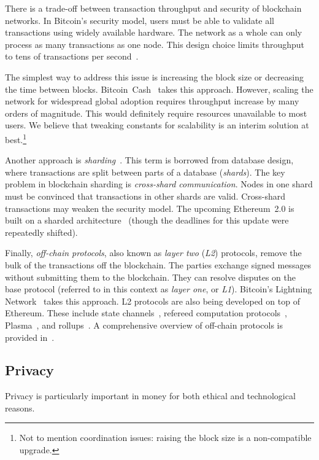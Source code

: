 There is a trade-off between transaction throughput and security of blockchain networks.
In Bitcoin's security model, users must be able to validate all transactions using widely available hardware.
The network as a whole can only process as many transactions as one node.
This design choice limits throughput to tens of transactions per second~\cite{Croman2016}.

The simplest way to address this issue is increasing the block size or decreasing the time between blocks.
Bitcoin~Cash~\cite{Kwon2019} takes this approach.
However, scaling the network for widespread global adoption requires throughput increase by many orders of magnitude.
This would definitely require resources unavailable to most users.
We believe that tweaking constants for scalability is an interim solution at best.\footnote{Not to mention coordination issues: raising the block size is a non-compatible upgrade.}

Another approach is \textit{sharding}~\cite{Gencer2016, Luu2016a}.
This term is borrowed from database design, where transactions are split between parts of a database (\textit{shards}).
The key problem in blockchain sharding is \textit{cross-shard communication}.
Nodes in one shard must be convinced that transactions in other shards are valid.
Cross-shard transactions may weaken the security model.
The upcoming Ethereum~2.0 is built on a sharded architecture~\cite{ShardingFAQ} (though the deadlines for this update were repeatedly shifted).

Finally, \textit{off-chain protocols}, also known as \textit{layer two} (\textit{L2}) protocols, remove the bulk of the transactions off the blockchain.
The parties exchange signed messages without submitting them to the blockchain.
They can resolve disputes on the base protocol (referred to in this context as \textit{layer one}, or \textit{L1}).
Bitcoin's Lightning Network~\cite{Poon2016} takes this approach.
L2 protocols are also being developed on top of Ethereum.
These include state channels~\cite{Dziembowski2017, RaidenWebsite, Miller2019, }, refereed computation protocols~\cite{Teutsch2017, Kalodner2018}, Plasma~\cite{Poon2017}, and rollups~\cite{Floersch2019, Gluchowski2019}.
A comprehensive overview of off-chain protocols is provided in~\cite{Gudgeon2019}.


\subsection{Privacy}

Privacy is particularly important in money for both ethical and technological reasons.

